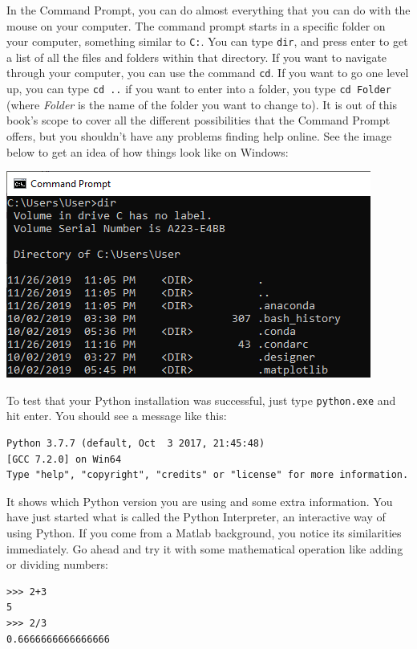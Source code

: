 In the Command Prompt, you can do almost everything that you can do with the mouse on your computer. The command prompt starts in a specific folder on your computer, something similar to \texttt{C:\Users\User}. You can type \texttt{dir}, and press enter to get a list of all the files and folders within that directory. If you want to navigate through your computer, you can use the command \texttt{cd}. If you want to go one level up, you can type \texttt{cd ..} if you want to enter into a folder, you type \texttt{cd Folder} (where \textit{Folder} is the name of the folder you want to change to). It is out of this book's scope to cover all the different possibilities that the Command Prompt offers, but you shouldn't have any problems finding help online. See the image below to get an idea of how things look like on Windows:

\begin{center}
\includegraphics[width=.5\textwidth]{images/Chapter_02/CommandPrompt03.png}
\end{center}

To test that your Python installation was successful, just type \texttt{python.exe} and hit enter. You should see a message like this:

\begin{verbatim}
Python 3.7.7 (default, Oct  3 2017, 21:45:48)
[GCC 7.2.0] on Win64
Type "help", "copyright", "credits" or "license" for more information.
\end{verbatim}

It shows which Python version you are using and some extra information. You have just started what is called the Python Interpreter, an interactive way of using Python. If you come from a Matlab background, you notice its similarities immediately. Go ahead and try it with some mathematical operation like adding or dividing numbers:

\begin{verbatim}
>>> 2+3
5
>>> 2/3
0.6666666666666666
\end{verbatim}

